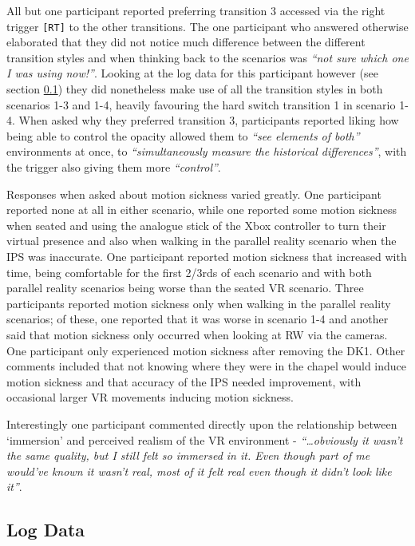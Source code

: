 All but one participant reported preferring transition 3 accessed via the right trigger \texttt{[RT]} to the other transitions. The one participant who answered otherwise elaborated that they did not notice much difference between the different transition styles and when thinking back to the scenarios was \textit{``not sure which one I was using now!''}. Looking at the log data for this participant however (see section \ref{2-1-log-data}) they did nonetheless make use of all the transition styles in both scenarios 1-3 and 1-4, heavily favouring the hard switch transition 1 in scenario 1-4. When asked why they preferred transition 3, participants reported liking how being able to control the opacity allowed them to \textit{``see elements of both''} environments at once, to \textit{``simultaneously measure the historical differences''}, with the trigger also giving them more \textit{``control''}.

Responses when asked about motion sickness varied greatly. One participant reported none at all in either scenario, while one reported some motion sickness when seated and using the analogue stick of the Xbox controller to turn their virtual presence and also when walking in the parallel reality scenario when the IPS was inaccurate. One participant reported motion sickness that increased with time, being comfortable for the first 2/3rds of each scenario and with both parallel reality scenarios being worse than the seated VR scenario. Three participants reported motion sickness only when walking in the parallel reality scenarios; of these, one reported that it was worse in scenario 1-4 and another said that motion sickness only occurred when looking at RW via the cameras. One participant only experienced motion sickness after removing the DK1. Other comments included that not knowing where they were in the chapel would induce motion sickness and that accuracy of the IPS needed improvement, with occasional larger VR movements inducing motion sickness.

Interestingly one participant commented directly upon the relationship between `immersion' and perceived realism of the VR environment - \textit{``\ldots obviously it wasn't the same quality, but I still felt so immersed in it. Even though part of me would've known it wasn't real, most of it felt real even though it didn't look like it''}.


\subsection{Log Data}
\label{2-1-log-data}


